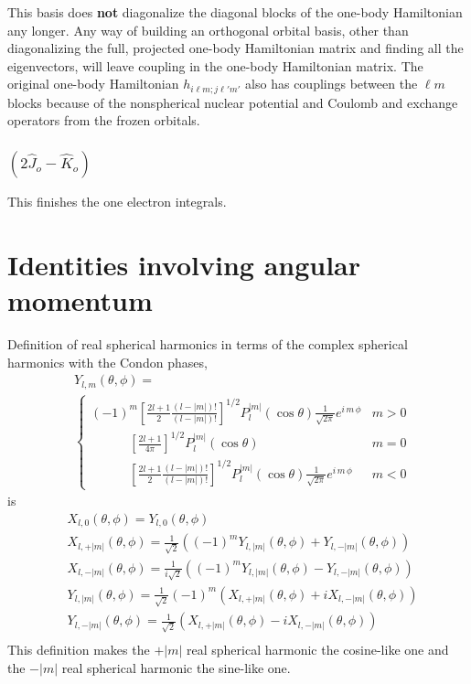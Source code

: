 \documentclass[%
pra%
,twocolumn%
,amssymb, nobibnotes, aps,
longbibliography
]{revtex4-1}
\begin{document}
This basis does \textbf{not} diagonalize the diagonal blocks of the one-body Hamiltonian any longer.  Any way of building an orthogonal orbital basis, other than diagonalizing the full, projected one-body Hamiltonian matrix and finding all the eigenvectors, will leave coupling in the one-body Hamiltonian matrix.  The original one-body Hamiltonian $h_{i \ell m;j \ell' m'}$ also has couplings between the $\ell m$ blocks because of the nonspherical nuclear potential and Coulomb and exchange operators from the frozen orbitals.


\subsubsection{$\left( 2 \hat{J}_o - \hat{K}_o \right)$}
This finishes the one electron integrals.


\appendix
\section{Identities involving angular momentum}
\label{sec:angmom}
Definition of real spherical harmonics in terms of the complex spherical harmonics with the Condon phases,
\begin{equation}
\begin{split}
&Y_{l,m}(\theta,\phi) =\\
&\begin{cases} (-1)^m  \left[ \frac{2l+1}{2} \frac{(l-|m|)!}{(l-|m|)!} \right]^{1/2} P_l^{|m|}(\cos \theta) \frac{1}{\sqrt{2\pi}} e^{i\, m \, \phi} & m>0 \\ 
\qquad \quad   \left[ \frac{2l+1}{4 \pi}  \right]^{1/2} P_l^{|m|}(\cos \theta)  & m=0 \\
\qquad \quad   \left[ \frac{2l+1}{2} \frac{(l-|m|)!}{(l-|m|)!} \right]^{1/2} P_l^{|m|}(\cos \theta)   \frac{1}{\sqrt{2\pi}} e^{i\, m \, \phi} & m < 0
\end{cases}
\end{split}
\end{equation}
is
\begin{equation}
\begin{split}
&X_{l,0}(\theta,\phi) = Y_{l,0}(\theta,\phi) \\
&X_{l,+|m|}(\theta,\phi) = \frac{1}{\sqrt{2}} \left((-1)^mY_{l,|m|}(\theta,\phi) + Y_{l,-|m|}(\theta,\phi) \right)\\
&X_{l,-|m|}(\theta,\phi) = \frac{1}{i\sqrt{2}} \left((-1)^mY_{l,|m|}(\theta,\phi) -Y_{l,-|m|}(\theta,\phi) \right)\\
& Y_{l,|m|}(\theta,\phi) = \frac{1}{\sqrt{2}} (-1)^m (X_{l,+|m|}(\theta,\phi)+i X_{l,-|m|}(\theta,\phi)) \\
& Y_{l,-|m|}(\theta,\phi) = \frac{1}{\sqrt{2}}  (X_{l,+|m|}(\theta,\phi)-iX_{l,-|m|}(\theta,\phi)) \\
\end{split}
\end{equation}
This definition makes the $+|m|$ real spherical harmonic the cosine-like one and the $-|m|$ real spherical harmonic the sine-like one.
\end{document}
